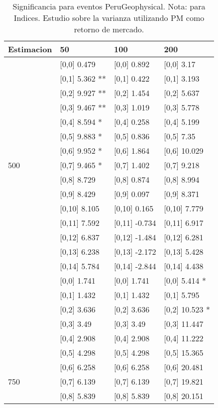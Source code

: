 \begin{table}

\caption{Significancia para eventos PeruGeophysical. Nota: para Indices. Estudio sobre la varianza utilizando PM como retorno de mercado.}
\centering
\begin{tabular}[t]{llll}
\toprule
Estimacion & 50 & 100 & 200\\
\midrule
 & {}[0,0] 0.479 & {}[0,0] 0.892 & {}[0,0] 3.17\\
 & {}[0,1] 5.362 ** & {}[0,1] 0.422 & {}[0,1] 3.193\\
 & {}[0,2] 9.927 ** & {}[0,2] 1.454 & {}[0,2] 5.637\\
 & {}[0,3] 9.467 ** & {}[0,3] 1.019 & {}[0,3] 5.778\\
 & {}[0,4] 8.594 * & {}[0,4] 0.258 & {}[0,4] 5.199\\
\addlinespace
 & {}[0,5] 9.883 * & {}[0,5] 0.836 & {}[0,5] 7.35\\
 & {}[0,6] 9.952 * & {}[0,6] 1.864 & {}[0,6] 10.029\\
500 & {}[0,7] 9.465 * & {}[0,7] 1.402 & {}[0,7] 9.218\\
 & {}[0,8] 8.729 & {}[0,8] 0.874 & {}[0,8] 8.994\\
 & {}[0,9] 8.429 & {}[0,9] 0.097 & {}[0,9] 8.371\\
\addlinespace
 & {}[0,10] 8.105 & {}[0,10] 0.165 & {}[0,10] 7.779\\
 & {}[0,11] 7.592 & {}[0,11] -0.734 & {}[0,11] 6.917\\
 & {}[0,12] 6.837 & {}[0,12] -1.484 & {}[0,12] 6.281\\
 & {}[0,13] 6.238 & {}[0,13] -2.172 & {}[0,13] 5.428\\
 & {}[0,14] 5.784 & {}[0,14] -2.844 & {}[0,14] 4.438\\
\addlinespace
 & {}[0,0] 1.741 & {}[0,0] 1.741 & {}[0,0] 5.414 *\\
 & {}[0,1] 1.432 & {}[0,1] 1.432 & {}[0,1] 5.795\\
 & {}[0,2] 3.636 & {}[0,2] 3.636 & {}[0,2] 10.523 *\\
 & {}[0,3] 3.49 & {}[0,3] 3.49 & {}[0,3] 11.447\\
 & {}[0,4] 2.908 & {}[0,4] 2.908 & {}[0,4] 11.222\\
\addlinespace
 & {}[0,5] 4.298 & {}[0,5] 4.298 & {}[0,5] 15.365\\
 & {}[0,6] 6.258 & {}[0,6] 6.258 & {}[0,6] 20.481\\
750 & {}[0,7] 6.139 & {}[0,7] 6.139 & {}[0,7] 19.821\\
 & {}[0,8] 5.839 & {}[0,8] 5.839 & {}[0,8] 20.151\\

\end{tabular}
\end{table}
